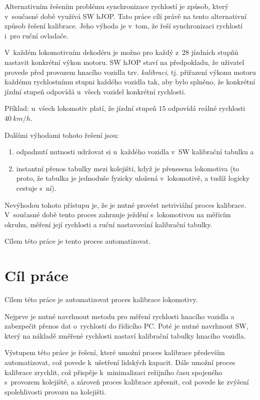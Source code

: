 Alternativním řešením problému synchronizace rychlostí je způsob, který
v~současné době využívá SW hJOP. Tato práce cílí právě na tento alternativní
způsob řešení kalibrace. Jeho výhoda je v~tom, že řeší synchronizaci
rychlostí i~pro ruční ovladače.

V~každém lokomotivním dekodéru je možno pro každý z~28 jízdních stupňů nastavit
konkrétní výkon motoru. SW hJOP staví na předpokladu, že uživatel provede před
provozem hnacího vozidla tzv. \textit{kalibraci}, tj. přiřazení výkonu motoru
každému rychlostnímu stupni každého vozidla tak, aby bylo splněno, že konkrétní
jízdní stupeň odpovídá u~všech vozidel konkrétní rychlosti.

Příklad: u~všech lokomotiv platí, že jízdní stupeň $15$ odpovídá reálné
rychlosti $40\ km/h$.

Dalšími výhodami tohoto řešení jsou:

\begin{enumerate}
	\item odpadnutí nutnosti udržovat si u~každého vozidla v~SW kalibrační
	tabulku a
	\item instantní přenos tabulky mezi kolejišti, když je přenesena
	lokomotiva (to proto, že tabulka je jednoduše fyzicky uložená v~lokomotivě,
	a tudíž logicky cestuje s~ní).
\end{enumerate}

Nevýhodou tohoto přístupu je, že je nutné provést netriviální proces kalibrace.
V~současné době tento proces zahrnuje ježdění s~lokomotivou na měřicím okruhu,
měření její rychlosti a ruční nastavování kalibrační tabulky.

Cílem této práce je tento proces automatizovat.

\section{Cíl práce}

Cílem této práce je automatizovat proces kalibrace lokomotivy.

Nejprve je nutné navrhnout metodu pro měření rychlosti hnacího vozidla a
zabezpečit přenos dat o~rychlosti do řídicího PC. Poté je nutné navrhnout SW,
který na nákladě změřené rychlosti nastaví kalibrační tabulky hnacího vozidla.

Výstupem této práce je řešení, které umožní proces kalibrace především
automatizovat, což povede k~ušetření lidských kapacit. Dále umožní proces
kalibrace zrychlit, což přispěje k~minimalizaci režijního času spojeného
s~provozem kolejiště, a zároveň proces kalibrace zpřesnit, což povede ke
zvýšení spolehlivosti provozu na kolejišti.
